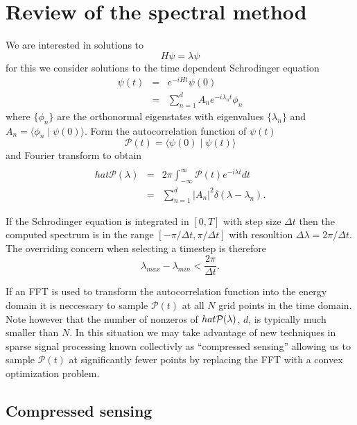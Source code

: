 \documentclass[12pt]{amsart}
\theoremstyle{remark}
\begin{document}
\section{Review of the spectral method}

We are interested in solutions to
\begin{equation}
H \psi = \lambda \psi
\end{equation}
for this we consider solutions to the time dependent Schrodinger equation
\begin{eqnarray}
\psi(t) &=& e^{-iHt}\psi(0) \\
&=& \sum_{n=1}^d A_n e^{-i\lambda_n t} \phi_n
\end{eqnarray}
where $\{ \phi_n \}$ are the orthonormal eigenstates with eigenvalues $\{ \lambda_n \}$ and $A_n = \langle \phi_n \mid \psi(0) \rangle$. Form the autocorrelation function of $\psi(t)$
\begin{equation}
\mathcal{P}(t) = \langle \psi(0) \mid \psi(t) \rangle
\end{equation}
and Fourier transform to obtain
\begin{eqnarray}
\\hat{\mathcal{P}}(\lambda) &=& 2\pi \int_{-\infty}^\infty \mathcal{P}(t) e^{-i\lambda t}dt \\
\label{ftautocor}
&=& \sum_{n=1}^d |A_n|^2 \delta(\lambda - \lambda_n).
\end{eqnarray}

If the Schrodinger equation is integrated in $[0,T]$ with step size $\Delta t$ then the computed spectrum is in the range $[-\pi / \Delta t, \pi / \Delta t]$ with resoultion $\Delta \lambda = 2\pi/\Delta t$. The overriding concern when selecting a timestep is therefore
\begin{equation}
\lambda_{max} - \lambda_{min} < \frac{2\pi}{\Delta t}.
\end{equation}

If an FFT is used to transform the autocorrelation function into the energy domain it is neccessary to sample $\mathcal{P}(t)$ at all $N$ grid points in the time domain. Note however that the number of nonzeros of $\\hat{\mathcal{P}}(\lambda)$, $d$, is typically much smaller than $N$. In this situation we may take advantage of new techniques in sparse signal processing known collectivly as ``compressed sensing'' allowing us to sample $\mathcal{P}(t)$ at significantly fewer points by replacing the FFT with a convex optimization problem.

\subsection{Compressed sensing}
\end{document}
